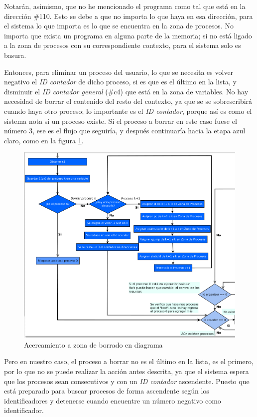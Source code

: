 \documentclass[letterpaper,12pt,oneside]{book}
\begin{document}
		Notarán, asimismo, que no he mencionado el programa como tal que está en la dirección \#110. Esto se debe
		a que no importa lo que haya en esa dirección, para el sistema
		lo que importa es lo que se encuentra en la zona de procesos. No importa que exista un programa
		en alguna parte de la memoria; si no está ligado a la zona de procesos con su correspondiente
		contexto, para el sistema solo es basura.
		
		Entonces, para eliminar un proceso del usuario, lo que se necesita es volver negativo el \textit{ID contador} de dicho proceso,
		si es que es el último en la lista, y disminuir el  \textit{ID contador general} (\#c4) que está en la zona de variables. 
		No hay necesidad 
		de borrar el contenido del resto
		del contexto, ya que se se sobrescribirá cuando haya otro proceso; lo importante es el \textit{ID contador}, porque así es como el sistema nota
		si un proceso existe. Si el proceso a borrar en este caso fuese el número 3, ese es el flujo que seguiría, y después continuaría hacia la 
		etapa azul claro, como en la figura 
		\ref{fig:diagZonaBorrado}.
		
		
		\begin{figure}[h]		
			\centering
			\includegraphics[scale=0.45]{media/CARDIACC/diagZOnaBorrado.png}
			\caption{ Acercamiento a zona de borrado en diagrama}
			\label{fig:diagZonaBorrado}
		\end{figure}
		
		Pero en nuestro caso, el proceso a borrar no es el último en la lista, es el primero, por lo que no se puede realizar la acción antes
		descrita, ya que el sistema espera que los procesos sean consecutivos y con un \textit{ID contador} ascendente. 
		Puesto que está preparado para buscar procesos de forma ascendente según los identificadores
		y detenerse cuando encuentre un número negativo como identificador. 
		
\end{document}
